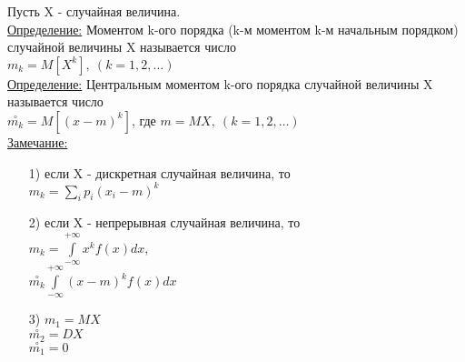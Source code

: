 

Пусть X - случайная величина.\\
\underline{Определение:} Моментом k-ого порядка (k-м моментом k-м начальным порядком) случайной величины X называется число\\
$m_k = M\left[X^k\right], \ (k = 1, 2, \ldots)$\\
\underline{Определение:} Центральным моментом k-ого порядка случайной величины X называется число\\
$\overset{\circ}{m_k} = M\left[(x - m)^k\right]$, где $m = MX, \ (k = 1,2,\ldots)$\\


\underline{Замечание:}\\
\begin{enumerate}
	\item[1)] если X - дискретная случайная величина, то\\
	$m_k = \sum\limits_i p_i (x_i - m)^k$\\
	
	\item[2)] если X - непрерывная случайная величина, то\\
	$\displaystyle  m_k = \int\limits_{-\infty}^{+\infty} x^k f(x) dx$, \\
	$\displaystyle  \overset{\circ}{m_k} \int\limits_{-\infty}^{+\infty} (x - m)^k f(x) dx$\\
	
	\item[3)] $m_1 = MX$\\
	$\overset{\circ}{m_2} = DX$\\
	$\overset{\circ}{m_1} = 0$\\
\end{enumerate}
